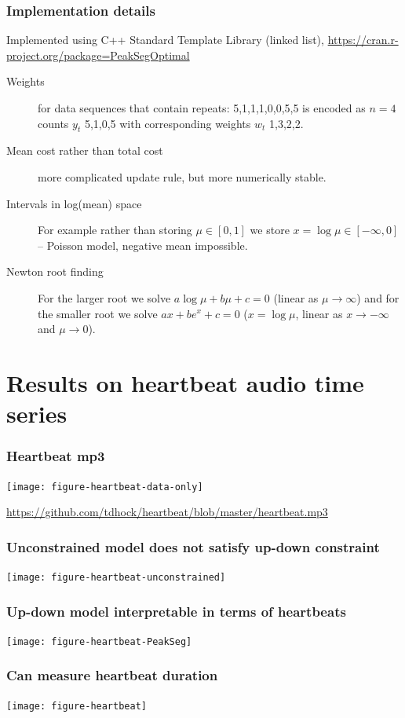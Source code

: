 \documentclass{beamer}
\begin{document}
\begin{frame}
  \frametitle{Implementation details}
  Implemented using C++ Standard Template Library (linked list),
  \url{https://cran.r-project.org/package=PeakSegOptimal}
\begin{description}
\item[Weights] for data sequences that contain repeats:
  5,1,1,1,0,0,5,5 is encoded as $n=4$ counts $y_t$ 5,1,0,5 with
  corresponding weights $w_t$ 1,3,2,2.
\item[Mean cost rather than total cost] more complicated update rule,
  but more numerically stable.
\item[Intervals in log(mean) space] For example rather than storing
  $\mu\in[0,1]$ we store $x=\log\mu\in[-\infty, 0]$ -- Poisson model,
  negative mean impossible.
\item[Newton root finding] For the larger root we solve
  $a\log\mu + b\mu + c = 0$ (linear as $\mu\rightarrow\infty$) and for
  the smaller root we solve $a x + be^x + c = 0$ ($x=\log \mu$, linear
  as $x\rightarrow -\infty$ and $\mu\rightarrow 0$). 
\end{description}
  
\end{frame}

\section{Results on heartbeat audio time series}

\begin{frame}
  \frametitle{Heartbeat mp3}
  \texttt{[image: figure-heartbeat-data-only]}

  \scriptsize
  \url{https://github.com/tdhock/heartbeat/blob/master/heartbeat.mp3}
\end{frame}

\begin{frame}
  \frametitle{Unconstrained 
model does not satisfy up-down constraint}
  \texttt{[image: figure-heartbeat-unconstrained]}
\end{frame}

\begin{frame}
  \frametitle{Up-down
model interpretable in terms of heartbeats}
  \texttt{[image: figure-heartbeat-PeakSeg]}
\end{frame}

\begin{frame}
  \frametitle{Can measure heartbeat duration}
  \texttt{[image: figure-heartbeat]}
\end{frame}
\end{document}
